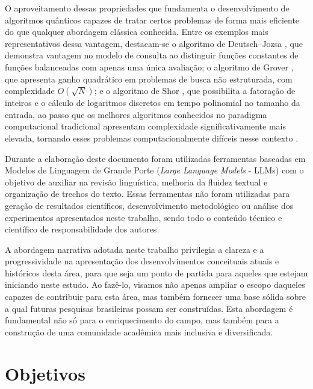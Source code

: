O aproveitamento dessas propriedades que fundamenta o desenvolvimento de algoritmos quânticos capazes de tratar certos problemas de forma mais eficiente do que qualquer abordagem clássica conhecida. Entre os exemplos mais representativos dessa vantagem, destacam-se o algoritmo de Deutsch–Jozsa \cite{deutsch1991rapid}, que demonstra vantagem no modelo de consulta ao distinguir funções constantes de funções balanceadas com apenas uma única avaliação; o algoritmo de Grover \cite{grover1996fast}, que apresenta ganho quadrático em problemas de busca não estruturada, com complexidade $O(\sqrt{N})$; e o algoritmo de Shor \cite{shor1999polynomial}, que possibilita a fatoração de inteiros e o cálculo de logaritmos discretos em tempo polinomial no tamanho da entrada, ao passo que os melhores algoritmos conhecidos no paradigma computacional tradicional apresentam complexidade significativamente mais elevada, tornando esses problemas computacionalmente difíceis nesse contexto \cite{lenstra1993development}.


Durante a elaboração deste documento foram utilizadas ferramentas baseadas em Modelos de Linguagem de Grande Porte (\textit{Large Language Models} - LLMs) com o objetivo de auxiliar na revisão linguística, melhoria da fluidez textual e organização de trechos do texto. Essas ferramentas não foram utilizadas para geração de resultados científicos, desenvolvimento metodológico ou análise dos experimentos apresentados neste trabalho, sendo todo o conteúdo técnico e científico de responsabilidade dos autores.

A abordagem narrativa adotada neste trabalho privilegia a clareza e a progressividade na apresentação dos desenvolvimentos conceituais atuais e históricos desta área, para que seja um ponto de partida para aqueles que estejam iniciando neste estudo. Ao fazê-lo, visamos não apenas ampliar o escopo daqueles capazes de contribuir para esta área, mas também fornecer uma base sólida sobre a qual futuras pesquisas brasileiras possam ser construídas. Esta abordagem é fundamental não só para o enriquecimento do campo, mas também para a construção de uma comunidade acadêmica mais inclusiva e diversificada.

\section*{Objetivos}

